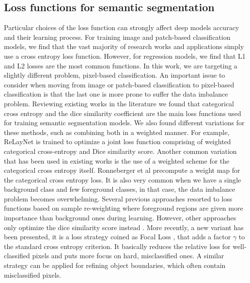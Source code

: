 \subsection{Loss functions for semantic segmentation}

Particular choices of the loss function can strongly affect deep models accuracy and their learning process. For training image and patch-based classification models, we find that the vast majority of research works and applications simply use a cross entropy loss function. However, for regression models, we find that L1 and L2 losses are the most common functions. In this work, we are targeting a slightly different problem, pixel-based classification. An important issue to consider when moving from image or patch-based classification to pixel-based classification is that the last one is more prone to suffer the data imbalance problem. Reviewing existing works in the literature we found that categorical cross entropy and the dice similarity coefficient are the main loss functions used for training semantic segmentation models. We also found different variations for these methods, such as combining both in a weighted manner. For example, ReLayNet \cite{Roy2017} is trained to optimize a joint loss function comprising of weighted categorical cross-entropy and Dice similarity score. Another common variation that has been used in existing works is the use of a weighted scheme for the categorical cross entropy itself. Ronneberger et al \cite{Ronneberger2015} precompute a weight map for the categorical cross entropy loss. It is also very common when we have a single background class and few foreground classes, in that case, the data imbalance problem becomes overwhelming. Several previous approaches resorted to loss functions based on sample re-weighting where foreground regions are given more importance than background ones during learning. However, other approaches only optimize the dice similarity score instead \cite{Milletari2016}. More recently, a new variant has been presented, it is a loss strategy coined as Focal Loss \cite{Lin2017b}, that adds a factor $\gamma$ to the standard cross entropy criterion. It basically reduces the relative loss for well-classified pixels and puts more focus on hard, misclassified ones. A similar strategy can be applied for refining object boundaries, which often contain misclassified pixels.
 
